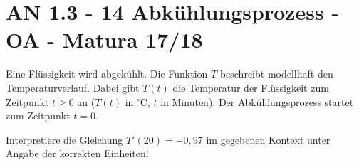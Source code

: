 \section{AN 1.3 - 14 Abkühlungsprozess - OA - Matura 17/18}

\begin{beispiel}[AN 1.3]{1} %
Eine Flüssigkeit wird abgekühlt. Die Funktion $T$ beschreibt modellhaft den Temperaturverlauf. Dabei gibt $T(t)$ die Temperatur der Flüssigkeit zum Zeitpunkt $t\geq 0$ an ($T(t)$ in $^\circ$C, $t$ in Minuten). Der Abkühlungsprozess startet zum Zeitpunkt $t=0$.

Interpretiere die Gleichung $T'(20)=-0,97$ im gegebenen Kontext unter Angabe der korrekten Einheiten!

\end{beispiel}